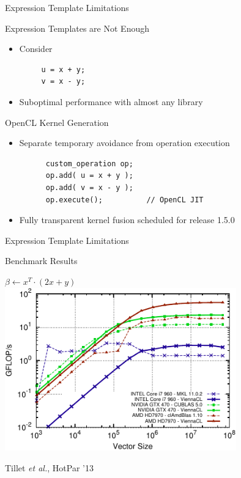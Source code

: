 \begin{frame}[fragile]{Expression Template Limitations}

 \begin{block}{Expression Templates are Not Enough}
  \begin{itemize}
   \item Consider
    \begin{lstlisting}
     u = x + y;
     v = x - y;
    \end{lstlisting}
   \item Suboptimal performance with almost any library
  \end{itemize}
 \end{block}

 \begin{block}{OpenCL Kernel Generation}
   \begin{itemize}
    \item Separate temporary avoidance from operation execution
    \begin{lstlisting}
      custom_operation op;
      op.add( u = x + y );
      op.add( v = x - y );
      op.execute();          // OpenCL JIT
    \end{lstlisting}
    \item Fully transparent kernel fusion scheduled for release 1.5.0
   \end{itemize}
 \end{block}
\end{frame}


\begin{frame}{Expression Template Limitations}

 \begin{block}{Benchmark Results}
  \begin{center}
   $\beta \leftarrow x^T \cdot (2x + y)$ \\
   \includegraphics[width=0.75\textwidth]{figures/daxpy_ddot.pdf} \\
  \end{center}
   \scriptsize Tillet \textit{et al.}, HotPar '13

 \end{block}

\end{frame}
